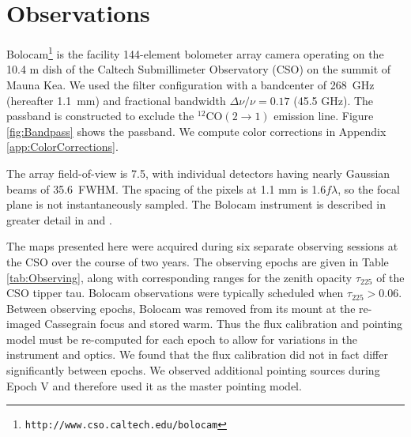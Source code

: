 \documentclass[12pt,preprint]{aastex}
\newcommand{\bcamfwhm}{35.6\arcsec}
\begin{document}
\clearpage

\section{Observations}
\label{sec:Observations}

Bolocam\footnote{{\tt http://www.cso.caltech.edu/bolocam}} is the
facility 144-element bolometer array camera operating on the 10.4 m
dish of the Caltech Submillimeter Observatory (CSO) on the summit of
Mauna Kea.  We used the filter configuration with a bandcenter of
268~GHz (hereafter 1.1~mm) and fractional bandwidth $\Delta \nu/\nu =
0.17$ (45.5 GHz).  The passband is constructed to exclude the $^{12}\mathrm{CO}(2
\to 1)$ emission line.  Figure \ref{fig:Bandpass} shows the passband.
We compute color corrections in Appendix \ref{app:ColorCorrections}.

The array field-of-view is 7\arcmin.5, with individual detectors
having nearly Gaussian beams of \bcamfwhm\ FWHM.  The spacing of the
pixels at 1.1 mm is 1.6$f\lambda$, so the focal plane is not
instantaneously sampled.  The Bolocam instrument is described in greater
detail in \citet{haig04} and \citet{glenn03}.


The maps presented here were acquired during six separate
observing sessions at the CSO over the course of two years.  The
observing epochs are given in Table \ref{tab:Observing}, along with
corresponding ranges for the zenith opacity $\tau_{225}$ of the CSO
tipper tau.  Bolocam
observations were typically scheduled when $\tau_{225} > 0.06$.
Between observing epochs, Bolocam was removed from its mount at
the re-imaged Cassegrain focus and stored warm.  Thus the flux
calibration and pointing model must be re-computed for each epoch to
allow for variations in the instrument and optics.  We found that the
flux calibration did not in fact differ significantly between epochs.
We observed additional pointing sources during Epoch V and therefore
used it as the master pointing model.



\end{document}
